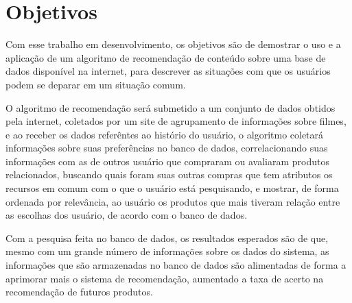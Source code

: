 \documentclass[12pt,
				openright,
				twoside,
				a4paper,
				apter=TITLE,
				section=TITLE,
				subsection=TITLE,
				chapter=TITLE,
				english,
				french,
				spanish,
				brazil]{abntex2}
\begin{document}
\section{Objetivos}
Com esse trabalho em desenvolvimento, os objetivos são de demostrar o uso e a aplicação de um algoritmo de recomendação de conteúdo sobre uma base de dados disponível na internet, para descrever as situações com que os usuários podem se deparar em um situação comum.

O algoritmo de recomendação será submetido a um conjunto de dados obtidos pela internet, coletados por um site  de agrupamento de informações sobre filmes, e ao receber os dados referêntes ao histório do usuário, o algoritmo coletará informações sobre suas preferências no banco de dados, correlacionando suas  informações com as de outros usuário que compraram ou avaliaram produtos relacionados, buscando quais foram suas outras  compras que tem atributos os recursos em comum com o que o usuário está pesquisando, e mostrar, de forma ordenada por relevância, ao  usuário os produtos que mais tiveram relação entre as escolhas dos usuário, de acordo com o banco de dados.

Com a pesquisa feita no banco de dados, os resultados esperados são de que, mesmo com um grande número de informações sobre os dados do sistema, as informações que são armazenadas no banco de dados são alimentadas de forma a aprimorar mais 
o sistema de recomendação, aumentado a taxa de acerto na recomendação de futuros produtos.
\end{document}
